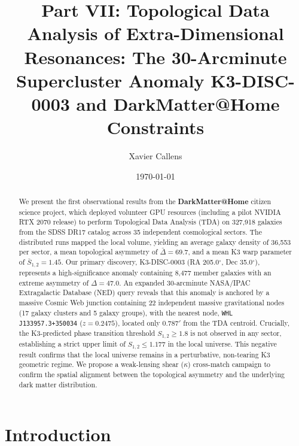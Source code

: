 \documentclass[aps,prd,twocolumn,nofootinbib,superscriptaddress,10pt]{revtex4-2}
\begin{document}
\title{Part VII: Topological Data Analysis of Extra-Dimensional Resonances: The 30-Arcminute Supercluster Anomaly K3-DISC-0003 and DarkMatter@Home Constraints}

\author{Xavier Callens}

\date{\today}


\begin{abstract}
We present the first observational results from the \textbf{DarkMatter@Home} citizen science project, which deployed volunteer GPU resources (including a pilot NVIDIA RTX 2070 release) to perform Topological Data Analysis (TDA) on 327,918 galaxies from the SDSS DR17 catalog across 35 independent cosmological sectors. 
The distributed runs mapped the local volume, yielding an average galaxy density of 36,553 per sector, a mean topological asymmetry of $\bar{\Delta} = 69.7$, and a mean K3 warp parameter of $\bar{S}_{1,2} = 1.45$. 
Our primary discovery, K3-DISC-0003 (RA 205.0$^\circ$, Dec 35.0$^\circ$), represents a high-significance anomaly containing 8,477 member galaxies with an extreme asymmetry of $\Delta = 47.0$. 
An expanded 30-arcminute NASA/IPAC Extragalactic Database (NED) query reveals that this anomaly is anchored by a massive Cosmic Web junction containing 22 independent massive gravitational nodes (17 galaxy clusters and 5 galaxy groups), with the nearest node, \texttt{WHL J133957.3+350034} ($z=0.2475$), located only 0.787$'$ from the TDA centroid. 
Crucially, the K3-predicted phase transition threshold $S_{1,2} \ge 1.8$ is not observed in any sector, establishing a strict upper limit of $S_{1,2} \le 1.177$ in the local universe. 
This negative result confirms that the local universe remains in a perturbative, non-tearing K3 geometric regime. 
We propose a weak-lensing shear ($\kappa$) cross-match campaign to confirm the spatial alignment between the topological asymmetry and the underlying dark matter distribution.
\end{abstract}

\maketitle

\section{Introduction}
\end{document}
